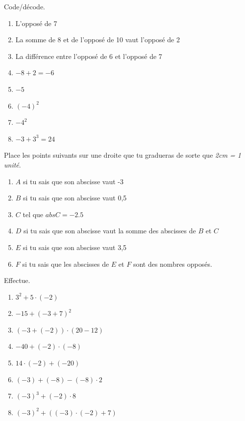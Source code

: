 \documentclass[parskip=half-, 12pt, DIV=15, twoside=semi]{scrbook}
\begin{document}
\begin{exercise}
    Code/décode.
    \begin{enumerate}[cols=2]
        \item L'opposé de 7
        \item La somme de 8 et de l'opposé de 10 vaut l'opposé de 2
        \item La différence entre l'opposé de 6 et l'opposé de 7
        \item $-8+2=-6$
        \item $-5$
        \item $(-4)^2$
        \item $-4^2$
        \item $-3+3^3=24$
    \end{enumerate}
\end{exercise}

\begin{exercise}
    Place les points suivants sur une droite que tu gradueras de sorte que \emph{2cm = 1 unité}.
    \begin{enumerate}[label=\ ]
        \item $A$ si tu sais que son abscisse vaut -3
        \item $B$ si tu sais que son abscisse vaut 0,5
        \item $C$ tel que $abs C = -2.5$
        \item $D$ si tu sais que son abscisse vaut la somme des abscisses de $B$ et $C$
        \item $E$ si tu sais que son abscisse vaut 3,5
        \item $F$ si tu sais que les abscisses de $E$ et $F$ sont des nombres opposés.
    \end{enumerate}
\end{exercise}

\pagebreak
\begin{exercise}
    Effectue.
    \begin{enumerate}[cols=2, itemsep=1emm]
        \item \(3^{2} + 5 \cdot ( - 2) \)
        \item \(- 15 + ( - 3 + 7)^{2} \)
        \item \(\left( - 3 + ( - 2) \right) \cdot (20 - 12) \)
        \item \(- 40 + ( - 2) \cdot ( - 8) \)
        \item \(14 \cdot ( - 2) + ( - 20) \)
        \item \(( - 3) + ( - 8) - ( - 8) \cdot 2 \)
        \item \(( - 3)^{3} + ( - 2) \cdot 8 \)
        \item \(( - 3)^{2} + \left( ( - 3) \cdot ( - 2) + 7 \right) \)
    \end{enumerate}
\end{exercise}
\end{document}
